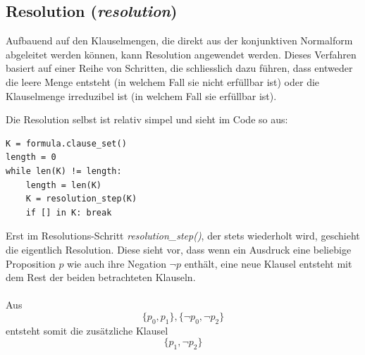 \documentclass[11pt,a4paper,ngerman]{scrreprt}
\begin{document}
\subsection{Resolution (\textit{resolution})}
Aufbauend auf den Klauselmengen, die direkt aus der konjunktiven Normalform abgeleitet werden können, kann Resolution angewendet werden. Dieses Verfahren basiert auf einer Reihe von Schritten, die schliesslich dazu führen, dass entweder die leere Menge entsteht (in welchem Fall sie nicht erfüllbar ist) oder die Klauselmenge irreduzibel ist (in welchem Fall sie erfüllbar ist).

Die Resolution selbst ist relativ simpel und sieht im Code so aus:
\begin{lstlisting}
K = formula.clause_set()
length = 0
while len(K) != length:
    length = len(K)
    K = resolution_step(K)
    if [] in K: break
\end{lstlisting}
Erst im Resolutions-Schritt \textit{resolution\_step()}, der stets wiederholt wird, geschieht die eigentlich Resolution. Diese sieht vor, dass wenn ein Ausdruck eine beliebige Proposition $p$ wie auch ihre Negation $\neg p$ enthält, eine neue Klausel entsteht mit dem Rest der beiden betrachteten Klauseln.\\\\
Aus 
\begin{equation}
\{p_0, p_1\}, \{\neg p_0, \neg p_2\}
\end{equation}
entsteht somit die zusätzliche Klausel
\begin{equation}
\{p_1, \neg p_2\}
\end{equation}
\end{document}
